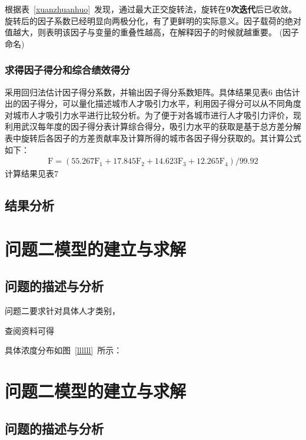 \documentclass{whutmod}
\begin{document}
		
		
	根据表~\ref{xuanzhuanhuo}~发现，通过最大正交旋转法，旋转在\textbf{9次迭代}后已收敛。旋转后的因子系数已经明显向两极分化，有了更鲜明的实际意义。因子载荷的绝对值越大，则表明该因子与变量的重叠性越高，在解释因子的时候就越重要。
	(因子命名)
	
	
	\subsubsection{求得因子得分和综合绩效得分}
	采用回归法估计因子得分系数，并输出因子得分系数矩阵。具体结果见表$6$
	由估计出的因子得分，可以量化描述城市人才吸引力水平，利用因子得分可以从不同角度对城市人才吸引力水平进行比较分析。为了便于对各城市进行人才吸引力评价，现利用武汉每年度的因子得分表计算综合得分，吸引力水平的获取是基于总方差分解表中旋转后各因子的方差贡献率及计算所得的城市各因子得分获取的。其计算公式如下：
	\begin{gather}
	\mathrm { F } = \left( 55.267 \mathrm { F } _ { 1 } + 17.845 \mathrm { F } _ { 2 } + 14.623 \mathrm { F } _ { 3 } + 12.265 \mathrm { F } _ { 4 } \right) / 99.92
	\end{gather}
	计算结果见表$7$
	\subsection{结果分析}
	
	\section{问题二模型的建立与求解}
	\subsection{问题的描述与分析}
	问题二要求针对具体人才类别，


	查阅资料可得\parencite{宋鸿2010城市人才吸引力的影响因素及提升对策}
	
具体浓度分布如图~\ref{llllll}~所示：


	\section{问题二模型的建立与求解}
	\subsection{问题的描述与分析}
\end{document}

